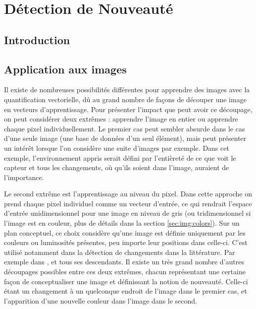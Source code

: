 
\chapter{Détection de Nouveauté}
	\minitoc
	\newpage




			
	\section{Introduction}

	\section{Application aux images}\label{sec:images}

	Il existe de nombreuses possibilités différentes pour apprendre des images avec la quantification vectorielle, dû au grand nombre de façons de découper une image en vecteurs d'apprentissage. Pour présenter l'impact que peut avoir ce découpage, on peut considérer deux extrêmes : apprendre l'image en entier ou apprendre chaque pixel individuellement. Le premier cas peut sembler absurde dans le cas d'une seule image (une base de données d'un seul élément), mais peut présenter un intérêt lorsque l'on considère une suite d'images par exemple. Dans cet exemple, l'environnement appris serait défini par l'entièreté de ce que voit le capteur et tous les changements, où qu'ils soient dans l'image, auraient de l'importance.

	Le second extrême est l'apprentissage au niveau du pixel. Dans cette approche on prend chaque pixel individuel comme un vecteur d'entrée, ce qui rendrait l'espace d'entrée unidimensionnel pour une image en niveau de gris (ou tridimensionnel si l'image est en couleur, plus de détails dans la section \ref{sec:img:colors}). Sur un plan conceptuel, ce choix considère qu'une image est définie uniquement par les couleurs ou luminosités présentes, peu importe leur positions dans celle-ci. C'est utilisé notamment dans la détection de changements dans la littérature. Par exemple dans \cite{maddalena2008self}, et tous ses descendants. Il existe un très grand nombre d'autres découpages possibles entre ces deux extrêmes, chacun représentant une certaine façon de conceptualiser une image et définissant la notion de nouveauté. Celle-ci étant un changement à un quelconque endroit de l'image dans le premier cas, et l'apparition d'une nouvelle couleur dans l'image dans le second.


